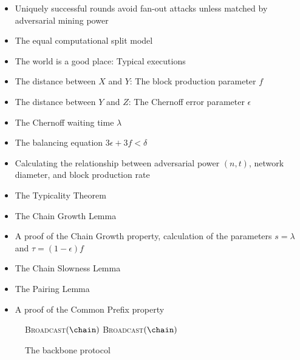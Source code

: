 {\begin{itemize}
\item Uniquely successful rounds avoid fan-out attacks unless matched by adversarial mining power
\item The equal computational split model
\item The world is a good place: Typical executions
\item The distance between $X$ and $Y$: The block production parameter $f$
\item The distance between $Y$ and $Z$: The Chernoff error parameter $\epsilon$
\item The Chernoff waiting time $\lambda$
\item The balancing equation $3\epsilon + 3f < \delta$
\item Calculating the relationship between adversarial power $(n, t)$, network diameter, and block production rate
\item The Typicality Theorem
\item The Chain Growth Lemma
\item A proof of the Chain Growth property, calculation of the parameters $s=\lambda$ and $\tau=(1 - \epsilon)f$
\item The Chain Slowness Lemma
\item The Pairing Lemma
\item A proof of the Common Prefix property
\end{itemize}
}

\begin{figure}[t]
  \begin{algorithm}[H]
      \caption{\label{alg.backbone} The backbone protocol}
      \begin{algorithmic}[1]
       \Statex
              \Let\chain{[\mathcal{G}]}
          \EndFunction
              \If{$\tilde\chain \neq \chain$}
                  \State\textsc{Broadcast}{$(\chain)$}
              \EndIf
                  \State\textsc{Broadcast}{$(\chain)$}
              \EndIf
          \EndFunction
              \EndFor
              \State{}
          \EndFunction
          \vskip8pt
      \end{algorithmic}
  \end{algorithm}
  \end{figure}


